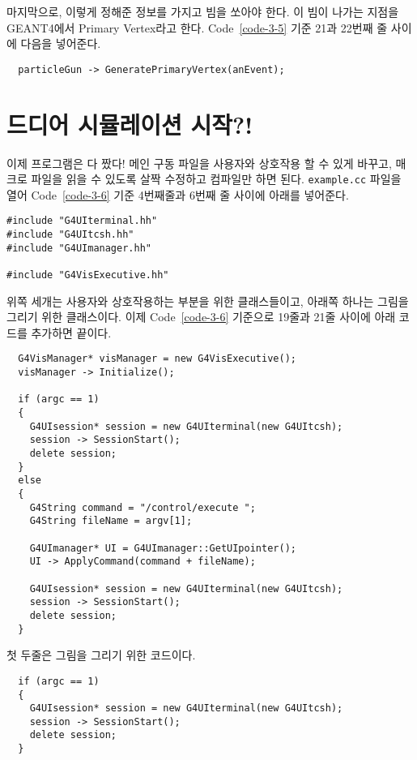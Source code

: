 마지막으로, 이렇게 정해준 정보를 가지고 빔을 쏘아야 한다. 이 빔이 나가는 지점을
GEANT4에서 Primary Vertex라고 한다. Code~\ref{code-3-5} 기준 21과 22번째 줄
사이에 다음을 넣어준다.
\begin{pc}
\begin{lstlisting}
  particleGun -> GeneratePrimaryVertex(anEvent);
\end{lstlisting}
\end{pc}

\section{드디어 시뮬레이션 시작?!}

이제 프로그램은 다 짰다! 메인 구동 파일을 사용자와 상호작용 할 수 있게 바꾸고,
매크로 파일을 읽을 수 있도록 살짝 수정하고 컴파일만 하면 된다.
\texttt{example.cc} 파일을 열어 Code~\ref{code-3-6} 기준 4번째줄과 6번째 줄
사이에 아래를 넣어준다.
\begin{pc}
\begin{lstlisting}
#include "G4UIterminal.hh"
#include "G4UItcsh.hh"
#include "G4UImanager.hh"

#include "G4VisExecutive.hh"
\end{lstlisting}
\end{pc}
위쪽 세개는 사용자와 상호작용하는 부분을 위한 클래스들이고, 아래쪽 하나는
그림을 그리기 위한 클래스이다. 이제 Code~\ref{code-3-6} 기준으로 19줄과 21줄
사이에 아래 코드를 추가하면 끝이다.
\begin{pc}
\begin{lstlisting}
  G4VisManager* visManager = new G4VisExecutive();
  visManager -> Initialize();

  if (argc == 1)
  {
    G4UIsession* session = new G4UIterminal(new G4UItcsh);
    session -> SessionStart();
    delete session;
  }
  else
  {
    G4String command = "/control/execute ";
    G4String fileName = argv[1];

    G4UImanager* UI = G4UImanager::GetUIpointer();
    UI -> ApplyCommand(command + fileName);
    
    G4UIsession* session = new G4UIterminal(new G4UItcsh);
    session -> SessionStart();
    delete session;
  }
\end{lstlisting}
\end{pc}
첫 두줄은 그림을 그리기 위한 코드이다.
\begin{pc}
\begin{lstlisting}
  if (argc == 1)
  {
    G4UIsession* session = new G4UIterminal(new G4UItcsh);
    session -> SessionStart();
    delete session;
  }
\end{lstlisting}
\end{pc}
